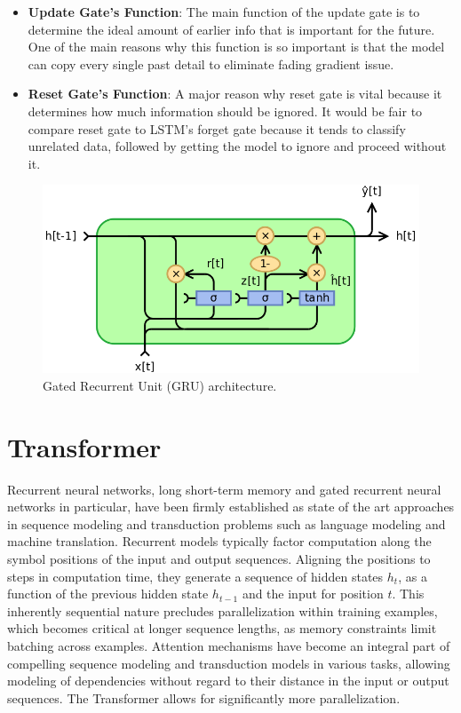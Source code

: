 \begin{itemize}
	\item \textbf{Update Gate’s Function}: The main function of the update gate is to determine the ideal amount of earlier info that is important for the future\cite{gru2}. One of the main reasons why this function is so important is that the model can copy every single past detail to eliminate fading gradient issue.
	\item \textbf{Reset Gate's Function}: A major reason why reset gate\cite{gru2} is vital because it determines how much information should be ignored. It would be fair to compare reset gate to LSTM’s forget gate because it tends to classify unrelated data, followed by getting the model to ignore and proceed without it\cite{gru1}.
\end{itemize}

\begin{figure}[H]
	\centering
	\includegraphics[width=.90\linewidth]{chapters/1_introduction/imgs/gru.png}
	\caption{Gated Recurrent Unit (GRU) architecture.}
	\label{fig:gruarch}
\end{figure}

\section{Transformer}

Recurrent neural networks, long short-term memory and gated recurrent neural networks
in particular, have been firmly established as state of the art approaches\cite{trans2} in sequence modeling and
transduction problems such as language modeling and machine translation.
Recurrent models typically factor computation along the symbol positions of the input and output
sequences. Aligning the positions to steps in computation time, they generate a sequence of hidden
states $h_t$, as a function of the previous hidden state $h_{t-1}$
and the input for position $t$. This inherently
sequential nature precludes parallelization within training examples, which becomes critical at longer
sequence lengths, as memory constraints limit batching across examples.
Attention mechanisms\cite{attention} have become an integral part of compelling sequence modeling and transduction models in various tasks, allowing modeling of dependencies without regard to their distance in
the input or output sequences.
The Transformer allows for significantly more parallelization\cite{trans1}.


